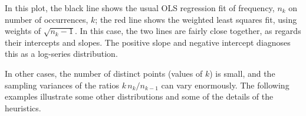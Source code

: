 \documentclass[11pt]{book}\usepackage[]{graphicx}\usepackage[]{color}
\begin{document}
In this plot, the black line shows the usual OLS regression fit of
frequency, $n_k$ on number of occurrences, $k$;  the red line shows
the weighted least squares fit, using weights of $\sqrt{n_k-1}$.
In this case, the two lines are fairly close together, as regards
their intercepts and slopes.  The positive slope and negative intercept
diagnoses this as a log-series distribution.

In other cases, the number of distinct points (values of $k$) is small,
and the sampling variances of the ratios $ k \, n_k / n_{k-1}$ can vary 
enormously.  The following examples illustrate some other distributions
and some of the details of the heuristics.

\end{document}
